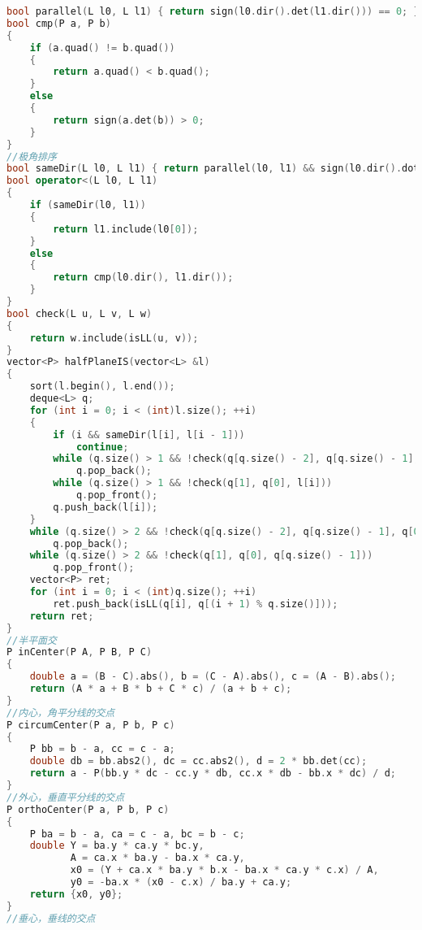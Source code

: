 \begin{lstlisting}[language=C++]
bool parallel(L l0, L l1) { return sign(l0.dir().det(l1.dir())) == 0; }
bool cmp(P a, P b)
{
    if (a.quad() != b.quad())
    {
        return a.quad() < b.quad();
    }
    else
    {
        return sign(a.det(b)) > 0;
    }
}
//极角排序
bool sameDir(L l0, L l1) { return parallel(l0, l1) && sign(l0.dir().dot(l1.dir())) == 1; }
bool operator<(L l0, L l1)
{
    if (sameDir(l0, l1))
    {
        return l1.include(l0[0]);
    }
    else
    {
        return cmp(l0.dir(), l1.dir());
    }
}
bool check(L u, L v, L w)
{
    return w.include(isLL(u, v));
}
vector<P> halfPlaneIS(vector<L> &l)
{
    sort(l.begin(), l.end());
    deque<L> q;
    for (int i = 0; i < (int)l.size(); ++i)
    {
        if (i && sameDir(l[i], l[i - 1]))
            continue;
        while (q.size() > 1 && !check(q[q.size() - 2], q[q.size() - 1], l[i]))
            q.pop_back();
        while (q.size() > 1 && !check(q[1], q[0], l[i]))
            q.pop_front();
        q.push_back(l[i]);
    }
    while (q.size() > 2 && !check(q[q.size() - 2], q[q.size() - 1], q[0]))
        q.pop_back();
    while (q.size() > 2 && !check(q[1], q[0], q[q.size() - 1]))
        q.pop_front();
    vector<P> ret;
    for (int i = 0; i < (int)q.size(); ++i)
        ret.push_back(isLL(q[i], q[(i + 1) % q.size()]));
    return ret;
}
//半平面交
P inCenter(P A, P B, P C)
{
    double a = (B - C).abs(), b = (C - A).abs(), c = (A - B).abs();
    return (A * a + B * b + C * c) / (a + b + c);
}
//内心，角平分线的交点
P circumCenter(P a, P b, P c)
{
    P bb = b - a, cc = c - a;
    double db = bb.abs2(), dc = cc.abs2(), d = 2 * bb.det(cc);
    return a - P(bb.y * dc - cc.y * db, cc.x * db - bb.x * dc) / d;
}
//外心，垂直平分线的交点
P orthoCenter(P a, P b, P c)
{
    P ba = b - a, ca = c - a, bc = b - c;
    double Y = ba.y * ca.y * bc.y,
           A = ca.x * ba.y - ba.x * ca.y,
           x0 = (Y + ca.x * ba.y * b.x - ba.x * ca.y * c.x) / A,
           y0 = -ba.x * (x0 - c.x) / ba.y + ca.y;
    return {x0, y0};
}
//垂心，垂线的交点

\end{lstlisting}
